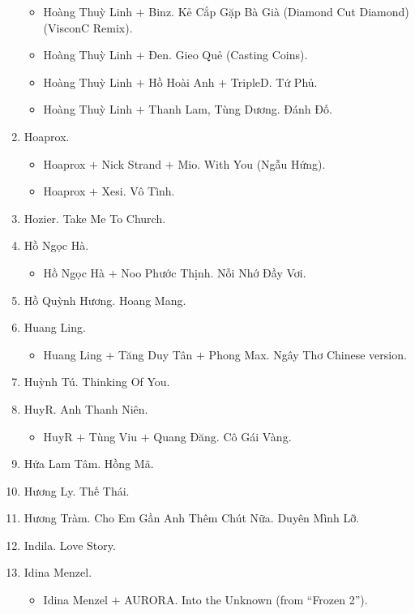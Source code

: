 \documentclass{article}
\begin{document}
\begin{enumerate}
	\begin{itemize}
		\item {\sc Hoàng Thuỳ Linh $+$ Binz.} Kẻ Cắp Gặp Bà Già (Diamond Cut Diamond) (VisconC Remix). 
		\item {\sc Hoàng Thuỳ Linh $+$ Đen.} Gieo Quẻ (Casting Coins).
		\item {\sc Hoàng Thuỳ Linh $+$ Hồ Hoài Anh $+$ TripleD.} Tứ Phủ.
		\item {\sc Hoàng Thuỳ Linh $+$ Thanh Lam, Tùng Dương.} Đánh Đố.
	\end{itemize}
	\item {\sc Hoaprox.}
	\begin{itemize}
		\item {\sc Hoaprox $+$ Nick Strand $+$ Mio.} With You (Ngẫu Hứng).
		\item {\sc Hoaprox $+$ Xesi.} Vô Tình.
	\end{itemize}
	\item {\sc Hozier.} Take Me To Church.
	\item {\sc Hồ Ngọc Hà.}
	\begin{itemize}
		\item {\sc Hồ Ngọc Hà $+$ Noo Phước Thịnh.} Nỗi Nhớ Đầy Vơi.
	\end{itemize}
	\item {\sc Hồ Quỳnh Hương.} Hoang Mang.
	\item {\sc Huang Ling.}
	\begin{itemize}
		\item {\sc Huang Ling $+$ Tăng Duy Tân $+$ Phong Max.} Ngây Thơ Chinese version.
	\end{itemize}
	\item {\sc Huỳnh Tú.} Thinking Of You.
	\item {\sc HuyR.} Anh Thanh Niên.
	\begin{itemize}
		\item {\sc HuyR $+$ Tùng Viu $+$ Quang Đăng.} Cô Gái Vàng.
	\end{itemize}
	\item {\sc Hứa Lam Tâm.} Hồng Mã.
	\item {\sc Hương Ly.} Thế Thái.
	\item {\sc Hương Tràm.} Cho Em Gần Anh Thêm Chút Nữa. Duyên Mình Lỡ.
	\item {\sc Indila.} Love Story.
	\item {\sc Idina Menzel.}
	\begin{itemize}
		\item {\sc Idina Menzel $+$ AURORA.} Into the Unknown (from ``Frozen 2'').

\end{itemize}
\end{enumerate}
\end{document}

